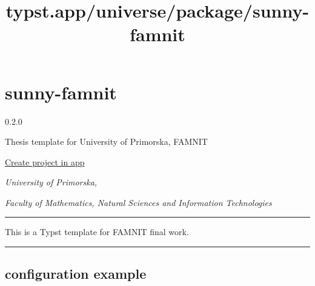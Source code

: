 \title{typst.app/universe/package/sunny-famnit}

\label{banner}
\label{template-thumbnail}

\section{sunny-famnit}\label{sunny-famnit}

{ 0.2.0 }

Thesis template for University of Primorska, FAMNIT

\href{/app?template=sunny-famnit&version=0.2.0}{Create project in app}

\label{readme}


\emph{University of Primorska,}

\emph{Faculty of Mathematics, Natural Sciences and Information
Technologies}

\begin{center}\rule{0.5\linewidth}{0.5pt}\end{center}

This is a Typst template for FAMNIT final work.

\begin{center}\rule{0.5\linewidth}{0.5pt}\end{center}

\subsection{configuration example}\label{configuration-example}

